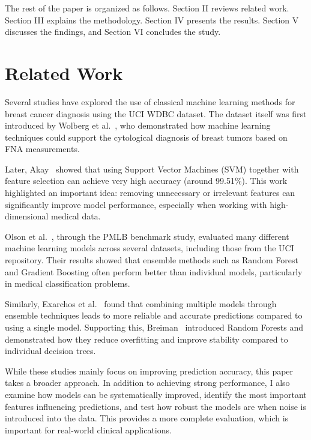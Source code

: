\documentclass[conference]{IEEEtran}
\begin{document}
The rest of the paper is organized as follows. Section II reviews related work. Section III explains the methodology. Section IV presents the results. Section V discusses the findings, and Section VI concludes the study.


\section{Related Work}

Several studies have explored the use of classical machine learning methods for breast cancer diagnosis using the UCI WDBC dataset. The dataset itself was first introduced by Wolberg et al.~\cite{wolberg1995}, who demonstrated how machine learning techniques could support the cytological diagnosis of breast tumors based on FNA measurements.

Later, Akay~\cite{akay2009} showed that using Support Vector Machines (SVM) together with feature selection can achieve very high accuracy (around 99.51\%). This work highlighted an important idea: removing unnecessary or irrelevant features can significantly improve model performance, especially when working with high-dimensional medical data.

Olson et al.~\cite{olson2017}, through the PMLB benchmark study, evaluated many different machine learning models across several datasets, including those from the UCI repository. Their results showed that ensemble methods such as Random Forest and Gradient Boosting often perform better than individual models, particularly in medical classification problems.

Similarly, Exarchos et al.~\cite{exarchos2012} found that combining multiple models through ensemble techniques leads to more reliable and accurate predictions compared to using a single model. Supporting this, Breiman~\cite{breiman2001} introduced Random Forests and demonstrated how they reduce overfitting and improve stability compared to individual decision trees.

While these studies mainly focus on improving prediction accuracy, this paper takes a broader approach. In addition to achieving strong performance, I also examine how models can be systematically improved, identify the most important features influencing predictions, and test how robust the models are when noise is introduced into the data. This provides a more complete evaluation, which is important for real-world clinical applications.
\end{document}
